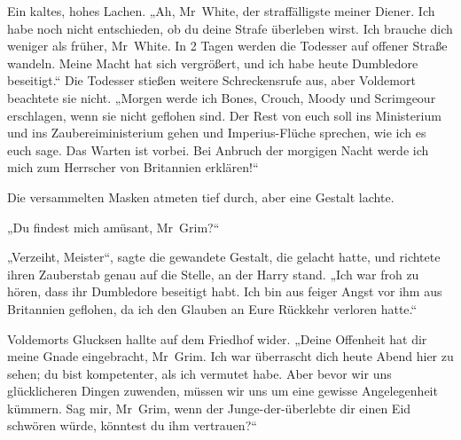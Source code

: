 Ein kaltes, hohes Lachen.
„Ah, Mr~White, der straffälligste meiner Diener. Ich habe noch nicht entschieden, ob du deine Strafe überleben wirst. Ich brauche dich weniger als früher, Mr~White. In 2 Tagen werden die Todesser auf offener Straße wandeln. Meine Macht hat sich vergrößert, und ich habe heute Dumbledore beseitigt.“
Die Todesser stießen weitere Schreckensrufe aus, aber Voldemort beachtete sie nicht.
„Morgen werde ich Bones, Crouch, Moody und Scrimgeour erschlagen, wenn sie nicht geflohen sind. Der Rest von euch soll ins Ministerium und ins Zaubereiministerium gehen und Imperius-Flüche sprechen, wie ich es euch sage. Das Warten ist vorbei. Bei Anbruch der morgigen Nacht werde ich mich zum Herrscher von Britannien erklären!“

Die versammelten Masken atmeten tief durch, aber eine Gestalt lachte.

„Du findest mich amüsant, Mr~Grim?“

„Verzeiht, Meister“, sagte die gewandete Gestalt, die gelacht hatte, und richtete ihren Zauberstab genau auf die Stelle, an der Harry stand. „Ich war froh zu hören, dass ihr Dumbledore beseitigt habt. Ich bin aus feiger Angst vor ihm aus Britannien geflohen, da ich den Glauben an Eure Rückkehr verloren hatte.“

Voldemorts Glucksen hallte auf dem Friedhof wider.
„Deine Offenheit hat dir meine Gnade eingebracht, Mr~Grim. Ich war überrascht dich heute Abend hier zu sehen; du bist kompetenter, als ich vermutet habe. Aber bevor wir uns glücklicheren Dingen zuwenden, müssen wir uns um eine gewisse Angelegenheit kümmern. Sag mir, Mr~Grim, wenn der Junge-der-überlebte dir einen Eid schwören würde, könntest du ihm vertrauen?“

